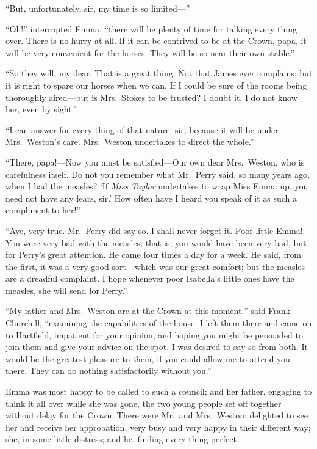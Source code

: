 ``But, unfortunately, sir, my time is so limited---''

``Oh!'' interrupted Emma, ``there will be plenty of time for talking
every thing over.  There is no hurry at all.  If it can be contrived
to be at the Crown, papa, it will be very convenient for the horses.
They will be so near their own stable.''

``So they will, my dear.  That is a great thing.  Not that James
ever complains; but it is right to spare our horses when we can.
If I could be sure of the rooms being thoroughly aired---but is
Mrs.\ Stokes to be trusted?  I doubt it.  I do not know her,
even by sight.''

``I can answer for every thing of that nature, sir, because it will
be under Mrs.\ Weston's care.  Mrs.\ Weston undertakes to direct
the whole.''

``There, papa!---Now you must be satisfied---Our own dear Mrs.\ Weston,
who is carefulness itself.  Do not you remember what Mr.\ Perry said,
so many years ago, when I had the measles?  `If \emph{Miss Taylor} undertakes
to wrap Miss Emma up, you need not have any fears, sir.'  How often
have I heard you speak of it as such a compliment to her!''

``Aye, very true.  Mr.\ Perry did say so.  I shall never forget it.
Poor little Emma!  You were very bad with the measles; that is,
you would have been very bad, but for Perry's great attention.
He came four times a day for a week.  He said, from the first,
it was a very good sort---which was our great comfort; but the measles
are a dreadful complaint.  I hope whenever poor Isabella's little ones
have the measles, she will send for Perry.''

``My father and Mrs.\ Weston are at the Crown at this moment,''
said Frank Churchill, ``examining the capabilities of the house.
I left them there and came on to Hartfield, impatient for your opinion,
and hoping you might be persuaded to join them and give your advice
on the spot.  I was desired to say so from both.  It would be the
greatest pleasure to them, if you could allow me to attend you there.
They can do nothing satisfactorily without you.''

Emma was most happy to be called to such a council; and her father,
engaging to think it all over while she was gone, the two young
people set off together without delay for the Crown.  There were
Mr.\ and Mrs.\ Weston; delighted to see her and receive her approbation,
very busy and very happy in their different way; she, in some
little distress; and he, finding every thing perfect.

